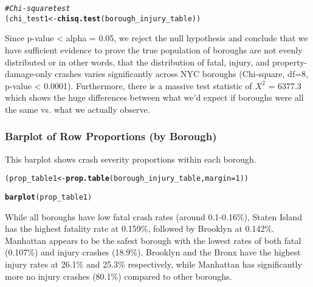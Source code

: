 \documentclass[10pt]{article}\usepackage[]{graphicx}\usepackage[]{xcolor}
\makeatletter
\newcommand{\hlnum}[1]{\textcolor[rgb]{0.686,0.059,0.569}{#1}}%
\newcommand{\hlcom}[1]{\textcolor[rgb]{0.678,0.584,0.686}{\textit{#1}}}%
\newcommand{\hldef}[1]{\textcolor[rgb]{0.345,0.345,0.345}{#1}}%
\newcommand{\hlkwb}[1]{\textcolor[rgb]{0.69,0.353,0.396}{#1}}%
\newcommand{\hlkwc}[1]{\textcolor[rgb]{0.333,0.667,0.333}{#1}}%
\newcommand{\hlkwd}[1]{\textcolor[rgb]{0.737,0.353,0.396}{\textbf{#1}}}%
\newenvironment{kframe}{%
 \def\at@end@of@kframe{}%
 \ifinner\ifhmode%
  \def\at@end@of@kframe{\end{minipage}}%
  \begin{minipage}{\columnwidth}%
 \fi\fi%
 \def\FrameCommand##1{\hskip\@totalleftmargin \hskip-\fboxsep
 \colorbox{shadecolor}{##1}\hskip-\fboxsep
     \hskip-\linewidth \hskip-\@totalleftmargin \hskip\columnwidth}%
 \MakeFramed {\advance\hsize-\width
   \@totalleftmargin\z@ \linewidth\hsize
   \@setminipage}}%
 {\par\unskip\endMakeFramed%
 \at@end@of@kframe}
\newenvironment{knitrout}{}{} %
\makeatother
\begin{document}
\begin{knitrout}
\color{fgcolor}\begin{kframe}
\begin{alltt}
\hlcom{# Chi-square test}
\hldef{(chi_test1} \hlkwb{<-} \hlkwd{chisq.test}\hldef{(borough_injury_table))}
\end{alltt}


{\ttfamily\noindent\bfseries\color{errorcolor}{\#\# Error: object 'borough\_injury\_table' not found}}\end{kframe}
\end{knitrout}

Since p-value < alpha = 0.05, we reject the null hypothesis and conclude that we have sufficient evidence to prove the true population of boroughs are not evenly distributed or in other words, that the distribution of fatal, injury, and property-damage-only crashes varies significantly across NYC boroughs (Chi-square, df=8, p-value < 0.0001). Furthermore, there is a massive test statistic of $X^2$ = 6377.3 which shows the huge differences between what we'd expect if boroughs were all the same vs. what we actually observe.


\subsubsection{Barplot of Row Proportions (by Borough)}
This barplot shows crash severity proportions within each borough.

\begin{knitrout}
\color{fgcolor}\begin{kframe}
\begin{alltt}
\hldef{(prop_table1} \hlkwb{<-} \hlkwd{prop.table}\hldef{(borough_injury_table,} \hlkwc{margin} \hldef{=} \hlnum{1}\hldef{))}
\end{alltt}


{\ttfamily\noindent\bfseries\color{errorcolor}{\#\# Error: object 'borough\_injury\_table' not found}}\begin{alltt}
\hlkwd{barplot}\hldef{(prop_table1)}
\end{alltt}


{\ttfamily\noindent\bfseries\color{errorcolor}{\#\# Error: object 'prop\_table1' not found}}\end{kframe}
\end{knitrout}

While all boroughs have low fatal crash rates (around 0.1-0.16\%), Staten Island has the highest fatality rate at 0.159\%, followed by Brooklyn at 0.142\%. Manhattan appears to be the safest borough with the lowest rates of both fatal (0.107\%) and injury crashes (18.9\%). Brooklyn and the Bronx have the highest injury rates at 26.1\% and 25.3\% respectively, while Manhattan has significantly more no injury crashes (80.1\%) compared to other boroughs.
\end{document}

